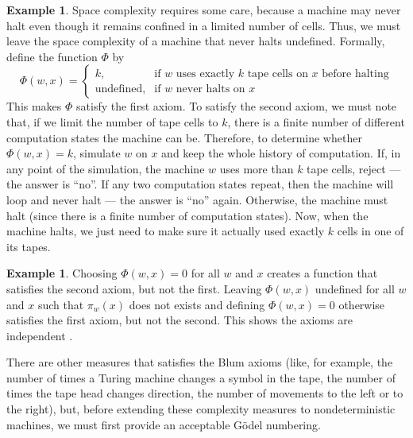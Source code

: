 \documentclass[12pt]{article}
\theoremstyle{definition}
\newtheorem{example}[definition]{Example}
\begin{document}
\begin{example}
    Space complexity requires some care,
    because a machine may never halt even though it remains confined
    in a limited number of cells.
    Thus, we must leave the space complexity of a machine that never halts undefined.
    Formally, define the function $\Phi$ by
    \begin{equation*}
        \Phi(w, x) = \begin{cases}
            k, &\text{if $w$ uses exactly $k$ tape cells on $x$ before halting} \\
            \text{undefined}, &\text{if $w$ never halts on $x$}
        \end{cases}
    \end{equation*}
    This makes $\Phi$ satisfy the first axiom.
    To satisfy the second axiom,
    we must note that,
    if we limit the number of tape cells to $k$,
    there is a finite number of different computation states
    the machine can be.
    Therefore,
    to determine whether $\Phi(w, x) = k$,
    simulate $w$ on $x$ and keep the whole history of computation.
    If, in any point of the simulation,
    the machine $w$ uses more than $k$ tape cells,
    reject --- the answer is ``no''.
    If any two computation states repeat,
    then the machine will loop and never halt
    --- the answer is ``no'' again.
    Otherwise, the machine must halt
    (since there is a finite number of computation states).
    Now, when the machine halts,
    we just need to make sure it actually used exactly $k$ cells in one of its tapes.
\end{example}

\begin{example}
    Choosing $\Phi(w, x) = 0$ for all $w$ and $x$
    creates a function that satisfies the second axiom,
    but not the first.
    Leaving $\Phi(w, x)$ undefined for all $w$ and $x$ such that
    $\pi_w(x)$ does not exists and defining $\Phi(w, x) = 0$ otherwise
    satisfies the first axiom, but not the second.
    This shows the axioms are independent \cite[p.~324]{Blum1967}.
\end{example}

There are other measures that satisfies the Blum axioms
(like, for example,
the number of times a Turing machine changes a symbol in the tape,
the number of times the tape head changes direction,
the number of movements to the left or to the right),
but, before extending these complexity measures to nondeterministic machines,
we must first provide an acceptable Gödel numbering.
\end{document}
